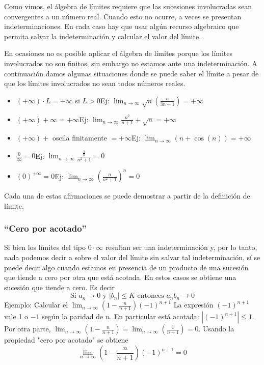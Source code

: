 \documentclass[../teoria.root.tex]{subfiles}
\begin{document}
Como vimos, el álgebra de límites requiere que las sucesiones involucradas sean convergentes a un número real.
Cuando esto no ocurre, a veces se presentan indeterminaciones.
En cada caso hay que usar algún recurso algebraico que permita salvar la indeterminación y calcular el valor del límite.

En ocasiones no es posible aplicar el álgebra de límites porque los límites involucrados no son finitos, sin embargo no estamos ante una indeterminación.
A continuación damos algunas situaciones donde se puede saber el límite a pesar de que los límites involucrados no sean todos números reales.
\begin{itemize}
    \item \((+\infty)\cdot L=+\infty\) si \(L>0\)\tab Ej:
          \(\lim_{n\to\infty}\sqrt{n}\left(\frac{n}{3n+1}\right)=+\infty\)
    \item \((+\infty)+\infty=+\infty\)\tab Ej:
          \(\lim_{n\to\infty}\frac{n^2}{n+1}+\sqrt{n}=+\infty\)
    \item \((+\infty)+\) oscila finitamente \(=+\infty\)\tab Ej:
          \(\lim_{n\to\infty}(n+\cos(n))=+\infty\)
    \item \(\frac{0}{\infty}=0\)\tab Ej:
          \(\lim_{n\to\infty}\frac{\frac{1}{n}}{n^2+1}=0\)
    \item \((0)^{+\infty}=0\)\tab Ej:
          \(\lim_{n\to\infty}\left(\frac{n}{n^2+1}\right)^n=0\)
\end{itemize}
Cada una de estas afirmaciones se puede demostrar a partir de la definición de límite.
\subsubsection{``Cero por acotado''}
Si bien los límites del tipo \(0\cdot\infty\) resultan ser una indeterminación y, por lo tanto, nada podemos decir a sobre el valor del límite sin salvar tal indeterminación, sí se puede decir algo cuando estamos en presencia de un producto de una sucesión que tiende a cero por otra que está acotada.
En estos casos se obtiene una sucesión que tiende a cero.
Es decir \[\text{Si }a_n\rightarrow0\text{ y }|b_n|\leq K\text{ entonces }a_nb_n\rightarrow0\]
Ejemplo: Calcular el \(\lim_{n\to\infty}\left(1-\frac{n}{n+1}\right)(-1)^{n+1}\)
La expresión \((-1)^{n+1}\) vale 1 o \(-1\) según la paridad de \(n\).
En particular está acotada: \(|(-1)^{n+1}|\leq1\).
Por otra parte, \(\lim_{n\to\infty}\left(1-\frac{n}{n+1}\right)=\lim_{n\to\infty}\left(\frac{1}{n+1}\right)=0\).
Usando la propiedad "cero por acotado" se obtiene
\[\lim_{n\to\infty}\left(1-\frac{n}{n+1}\right)(-1)^{n+1}=0\]
\end{document}
